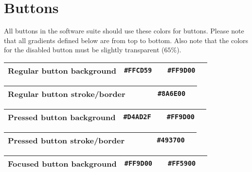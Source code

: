 \section{Buttons}
All buttons in the \giraf software suite should use these colors for buttons. Please note that all gradients defined below are from top to bottom. Also note that the colors for the disabled button must be slightly transparent ($65\%$).

\begin{table}[!htbp]
	\begin{tabularx}{\textwidth}{X r c r c}
		Regular button background 
		& \texttt{\#FFCD59} & \cellcolor[HTML]{FFCD59}\phantom{--}
		& \texttt{\#FF9D00} & \cellcolor[HTML]{FF9D00}\phantom{--} \\ \hline
	\end{tabularx}
\end{table}

\begin{table}[!htbp]
	\begin{tabularx}{\textwidth}{X r c r c}
		Regular button stroke/border 
		& ~ & ~
		& \texttt{\#8A6E00} & \cellcolor[HTML]{8A6E00}\phantom{--} \\ \hline
	\end{tabularx}
\end{table}

\begin{table}[!htbp]
	\begin{tabularx}{\textwidth}{X r c r c}
		Pressed button background 
		& \texttt{\#D4AD2F} & \cellcolor[HTML]{D4AD2F}\phantom{--}
		& \texttt{\#FF9D00} & \cellcolor[HTML]{FF9D00}\phantom{--} \\ \hline
	\end{tabularx}
\end{table}

\begin{table}[!htbp]
	\begin{tabularx}{\textwidth}{X r c r c}
		Pressed button stroke/border 
		& ~ & ~
		& \texttt{\#493700} & \cellcolor[HTML]{493700}\phantom{--} \\ \hline
	\end{tabularx}
\end{table}

\begin{table}[!htbp]
	\begin{tabularx}{\textwidth}{X r c r c}
		Focused button background 
		& \texttt{\#FF9D00} & \cellcolor[HTML]{FF9D00}\phantom{--}
		& \texttt{\#FF5900} & \cellcolor[HTML]{FF5900}\phantom{--} \\ \hline
	\end{tabularx}
\end{table}

